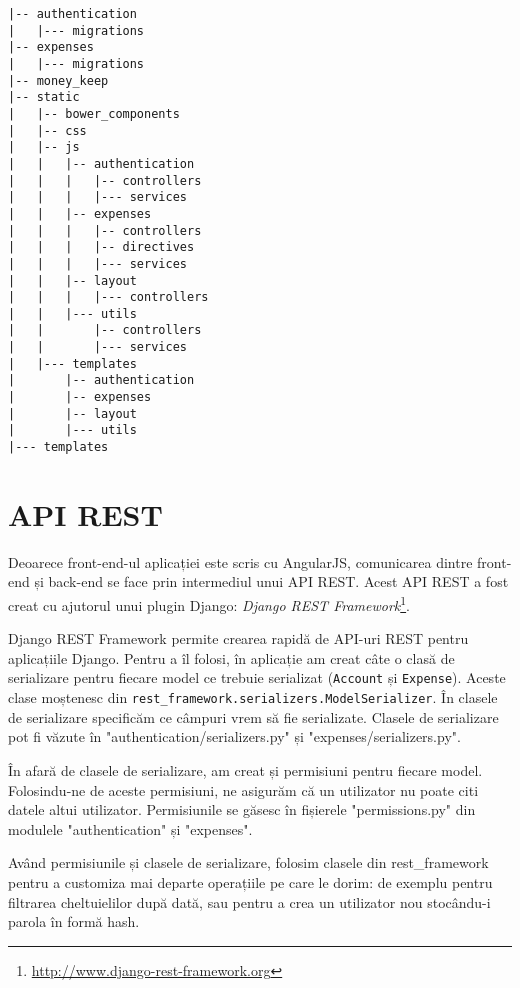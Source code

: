 \begin{lstlisting}[title=Structura de directoare a aplicației]
|-- authentication
|   |--- migrations
|-- expenses
|   |--- migrations
|-- money_keep
|-- static
|   |-- bower_components
|   |-- css
|   |-- js
|   |   |-- authentication
|   |   |   |-- controllers
|   |   |   |--- services
|   |   |-- expenses
|   |   |   |-- controllers
|   |   |   |-- directives
|   |   |   |--- services
|   |   |-- layout
|   |   |   |--- controllers
|   |   |--- utils
|   |       |-- controllers
|   |       |--- services
|   |--- templates
|       |-- authentication
|       |-- expenses
|       |-- layout
|       |--- utils
|--- templates
\end{lstlisting}


\section{API REST}

Deoarece front-end-ul aplicației este scris cu AngularJS,
comunicarea dintre front-end și back-end se face
prin intermediul unui API REST. Acest API REST a fost
creat cu ajutorul unui plugin Django: 
\emph{Django REST Framework}\footnote{\url{http://www.django-rest-framework.org}}.

Django REST Framework permite crearea rapidă de API-uri REST pentru 
aplicațiile Django. Pentru a îl folosi, în aplicație am creat
câte o clasă de serializare pentru fiecare model 
ce trebuie serializat (\texttt{Account} și \texttt{Expense}).
Aceste clase moștenesc din \texttt{rest\_framework.serializers.ModelSerializer}.
În clasele de serializare specificăm ce câmpuri vrem să fie serializate.
Clasele de serializare pot fi văzute în "authentication/serializers.py"
și "expenses/serializers.py".

În afară de clasele de serializare, am creat și permisiuni pentru fiecare
model. Folosindu-ne de aceste permisiuni, ne asigurăm că un utilizator
nu poate citi datele altui utilizator. Permisiunile se găsesc
în fișierele "permissions.py" din modulele "authentication" și
"expenses".

Având permisiunile și clasele de serializare, folosim clasele
din rest\_framework pentru a customiza mai departe
operațiile pe care le dorim: de exemplu pentru filtrarea 
cheltuielilor după dată, sau pentru a crea un utilizator nou
stocându-i parola în formă hash.

